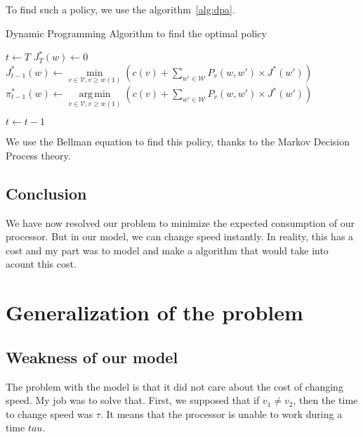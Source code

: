 \documentclass[
10pt, %
a4paper, %
oneside, %
headinclude,footinclude, %
BCOR5mm, %
]{scrartcl}
\DeclareMathOperator*{\argmin}{arg\,min}
\newcommand{\V}{\mathcal{V}}
\newcommand{\W}{\mathcal{W}}
\begin{document}
To find such a policy, we use the algorithm~\ref{alg:dpa}.
\begin{algorithm}
  \caption{Dynamic Programming Algorithm to find the optimal policy}
  \label{alg:dpa}
  \begin{algorithmic}
    \STATE $t\leftarrow T$
    \FORALL{$w\in\W$}
    \STATE $J_T^*(w)\leftarrow 0$
    \ENDFOR
    \FORALL{$w\in\W$}
    \STATE $J_{t-1}^*(w)\leftarrow
    \min\limits_{v\in\V,v\geq
      w(1)}\left(c(v)+\sum\limits_{w'\in\W}P_v(w,w')\times
      J^*(w')\right)$
    \STATE $\pi_{t-1}^*(w)\leftarrow
    \argmin\limits_{v\in\V,v\geq
      w(1)}\left(c(v)+\sum\limits_{w'\in\W}P_v(w,w')\times
      J^*(w')\right)$
    
    \ENDFOR
    \STATE $t\leftarrow t-1$
    \ENDWHILE
  \end{algorithmic}
\end{algorithm}

We use the Bellman equation to find this policy, thanks to the Markov
Decision Process theory.

\subsection{Conclusion}

We have now resolved our problem to minimize the expected consumption
of our processor. But in our model, we can change speed instantly. In
reality, this has a cost and my part was to model and make a algorithm
that would take into acount this cost.

\section{Generalization of the problem}

\subsection{Weakness of our model}
The problem with the model is that it did not care about the cost of
changing speed. My job was to solve that. First, we supposed that if
$v_1\neq v_2$, then the time to change speed was $\tau$. It means that
the processor is unable to work during a time $tau$.
\end{document}
